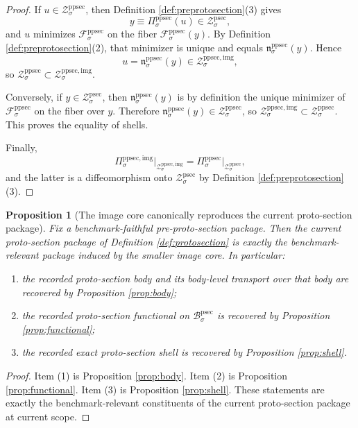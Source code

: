 \documentclass[11pt]{article}
\newcommand{\ProtoSectionBody}[1]{\mathcal B_{#1}^{\mathrm{psec}}}
\newcommand{\ProtoSectionShell}[1]{\mathcal Z_{#1}^{\mathrm{psec}}}
\newcommand{\PreProtoSectionProj}[1]{\Pi_{#1}^{\mathrm{ppsec}}}
\newcommand{\PreProtoSectionFiber}[2]{\mathcal F_{#1}^{\mathrm{ppsec}}(#2)}
\newcommand{\PreProtoSectionProtoMin}[1]{\mathfrak n_{#1}^{\mathrm{ppsec}}}
\newcommand{\PreProtoSectionFunctional}[1]{\mathscr F_{#1}^{\mathrm{ppsec}}}
\newcommand{\PreProtoSectionShell}[1]{\mathcal Z_{#1}^{\mathrm{ppsec}}}
\newcommand{\PreProtoSectionImgProj}[1]{\Pi_{#1}^{\mathrm{ppsec,img}}}
\newcommand{\PreProtoSectionImgShell}[1]{\mathcal Z_{#1}^{\mathrm{ppsec,img}}}
\newtheorem{proposition}{Proposition}
\begin{document}
\begin{proof}
If \(u\in\PreProtoSectionShell{\sigma}\), then Definition \ref{def:preprotosection}(3) gives
\[
y\equiv \PreProtoSectionProj{\sigma}(u)\in\ProtoSectionShell{\sigma},
\]
and \(u\) minimizes \(\PreProtoSectionFunctional{\sigma}\) on the fiber \(\PreProtoSectionFiber{\sigma}{y}\). By Definition \ref{def:preprotosection}(2), that minimizer is unique and equals \(\PreProtoSectionProtoMin{\sigma}(y)\). Hence
\[
u=\PreProtoSectionProtoMin{\sigma}(y)\in\PreProtoSectionImgShell{\sigma},
\]
so \(\PreProtoSectionShell{\sigma}\subset\PreProtoSectionImgShell{\sigma}\).

Conversely, if \(y\in\ProtoSectionShell{\sigma}\), then \(\PreProtoSectionProtoMin{\sigma}(y)\) is by definition the unique minimizer of \(\PreProtoSectionFunctional{\sigma}\) on the fiber over \(y\). Therefore \(\PreProtoSectionProtoMin{\sigma}(y)\in\PreProtoSectionShell{\sigma}\), so \(\PreProtoSectionImgShell{\sigma}\subset\PreProtoSectionShell{\sigma}\). This proves the equality of shells.

Finally,
\[
\PreProtoSectionImgProj{\sigma}\big|_{\PreProtoSectionImgShell{\sigma}}
=
\PreProtoSectionProj{\sigma}\big|_{\PreProtoSectionShell{\sigma}},
\]
and the latter is a diffeomorphism onto \(\ProtoSectionShell{\sigma}\) by Definition \ref{def:preprotosection}(3).
\end{proof}

\begin{proposition}[The image core canonically reproduces the current proto-section package]
\label{prop:package}
Fix a benchmark-faithful pre-proto-section package. Then the current proto-section package of Definition \ref{def:protosection} is exactly the benchmark-relevant package induced by the smaller image core. In particular:
\begin{enumerate}
    \item the recorded proto-section body and its body-level transport over that body are recovered by Proposition \ref{prop:body};
    \item the recorded proto-section functional on \(\ProtoSectionBody{\sigma}\) is recovered by Proposition \ref{prop:functional};
    \item the recorded exact proto-section shell is recovered by Proposition \ref{prop:shell}.
\end{enumerate}
\end{proposition}

\begin{proof}
Item (1) is Proposition \ref{prop:body}. Item (2) is Proposition \ref{prop:functional}. Item (3) is Proposition \ref{prop:shell}. These statements are exactly the benchmark-relevant constituents of the current proto-section package at current scope.
\end{proof}
\end{document}
